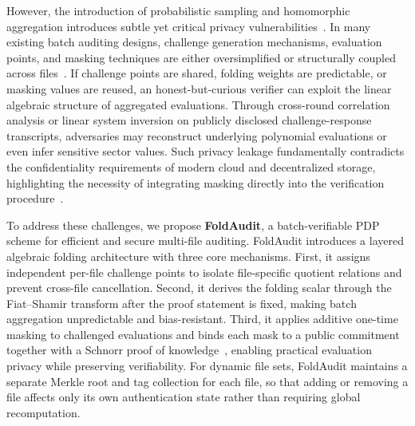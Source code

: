 \documentclass[lettersize,journal]{IEEEtran}
\begin{document}
However, the introduction of probabilistic sampling and homomorphic aggregation introduces subtle yet critical privacy vulnerabilities~\cite{Wang2010PrivacyAudit}. 
In many existing batch auditing designs, challenge generation mechanisms, evaluation points, and masking techniques are either oversimplified or structurally coupled across files~\cite{ZhangTPDS23,XuTIFS26}. 
If challenge points are shared, folding weights are predictable, or masking values are reused, an honest-but-curious verifier can exploit the linear algebraic structure of aggregated evaluations. Through cross-round correlation analysis or linear system inversion on publicly disclosed challenge-response transcripts, adversaries may reconstruct underlying polynomial evaluations or even infer sensitive sector values. Such privacy leakage fundamentally contradicts the confidentiality requirements of modern cloud and decentralized storage, highlighting the necessity of integrating masking directly into the verification procedure~\cite{Wang2013TC,MiaoSCIS2026}.


To address these challenges, we propose \textbf{FoldAudit}, a batch-verifiable PDP scheme for efficient and secure multi-file auditing. FoldAudit introduces a layered algebraic folding architecture with three core mechanisms. First, it assigns independent per-file challenge points to isolate file-specific quotient relations and prevent cross-file cancellation. Second, it derives the folding scalar through the Fiat--Shamir transform after the proof statement is fixed, making batch aggregation unpredictable and bias-resistant. Third, it applies additive one-time masking to challenged evaluations and binds each mask to a public commitment together with a Schnorr proof of knowledge~\cite{Schnorr1991Sig}, enabling practical evaluation privacy while preserving verifiability. For dynamic file sets, FoldAudit maintains a separate Merkle root and tag collection for each file, so that adding or removing a file affects only its own authentication state rather than requiring global recomputation.
\end{document}
